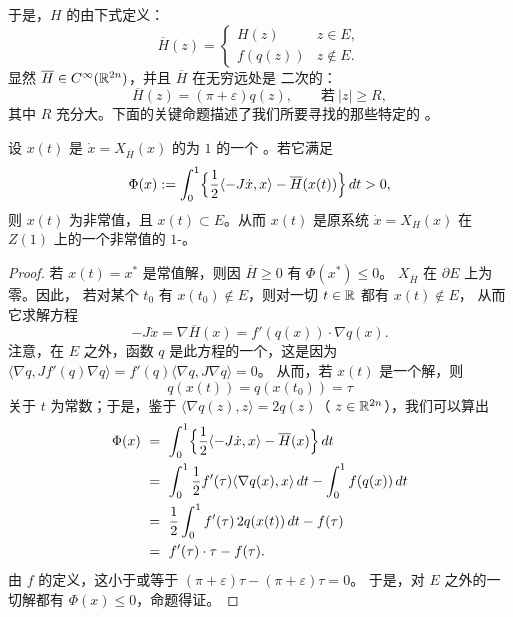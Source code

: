 于是，$H$ 的\trContinuation{}由下式定义：
\[
\overline{H}(z)=
\begin{cases}
H(z) & z\in E,\\[4pt]
f(q(z)) & z\notin E.
\end{cases}
\]
显然 $\overline{H}\in C^{\infty}(\mathbb{R}^{2n})$，并且 $\overline{H}$ 在无穷远处是%
二次的：
\[
\overline{H}(z)=(\pi+\varepsilon)q(z),\qquad\text{若}\ |z|\geq R,
\]
其中 $R$ 充分大。下面的关键命题描述了我们所要寻找的那些特定的%
\trPeriodicSolution。

\begin{proposition}\label{prop:phi-positive-in-E}
设 $x(t)$ 是 $\dot{x}=X_{\overline{H}}(x)$ 的\trPeriodic{}为 $1$ 的一个%
\trPeriodicSolution。若它满足
\[
\Phi(x):=\int_{0}^{1}\Bigl\{\frac{1}{2}\langle-J\dot{x},x\rangle-%
\overline{H}(x(t))\Bigr\}\,dt>0,
\]
则 $x(t)$ 为非常值，且 $x(t)\subset E$。从而 $x(t)$ 是原系统%
$\dot{x}=X_H(x)$ 在 $Z(1)$ 上的一个非常值的 $1$-\trPeriodicSolution。
\end{proposition}

\begin{proof}
若 $x(t)=x^{*}$ 是常值解，则因 $\overline{H}\geq0$ 有 $\Phi(x^{*})\leq0$。%
\trHamiltonianVectorField{} $X_{\overline{H}}$ 在 $\partial E$ 上为零。因此，%
若对某个 $t_{0}$ 有 $x(t_{0})\notin E$，则对一切 $t\in\mathbb{R}$ 都有 $x(t)\notin E$，%
从而它求解方程
\[
-J\dot{x}=\nabla\overline{H}(x)=f'(q(x))\cdot\nabla q(x).
\]
注意，在 $E$ 之外，函数 $q$ 是此方程的一个\trFirstIntegral，这是因为%
$\langle\nabla q,Jf'(q)\nabla q\rangle=f'(q)\langle\nabla q,J\nabla q\rangle=0$。%
从而，若 $x(t)$ 是一个解，则
\[
q(x(t))=q(x(t_{0}))=\tau
\]
关于 $t$ 为常数；于是，鉴于 $\langle\nabla q(z),z\rangle=2q(z)$（%
$z\in\mathbb{R}^{2n}$），我们可以算出
\begin{align*}
\Phi(x)\ &=\ \int_{0}^{1}\Bigl\{\frac{1}{2}\langle-J\dot{x},x\rangle-%
\overline{H}(x)\Bigr\}\,dt\\
&=\ \int_{0}^{1}\frac{1}{2}f'(\tau)\langle\nabla q(x),x\rangle\,dt-%
\int_{0}^{1}f(q(x))\,dt\\
&=\ \frac{1}{2}\int_{0}^{1}f'(\tau)\,2q(x(t))\,dt-f(\tau)\\
&=\ f'(\tau)\cdot\tau-f(\tau).
\end{align*}
由 $f$ 的定义，这小于或等于 $(\pi+\varepsilon)\tau-(\pi+\varepsilon)\tau=0$。%
于是，对 $E$ 之外的一切解都有 $\Phi(x)\leq0$，命题得证。
\end{proof}

